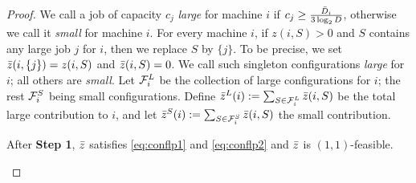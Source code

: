\begin{proof}
		We call a job of capacity $c_j$ {\em large} for machine $i$ if $c_j \geq \frac{\bar{D}_i}{3\log_2 D}$, otherwise we call it \emph{small} for machine $i$. 
%	
%		
%
%				
%
For every machine $i$, if $z(i,S) > 0$ and $S$ contains any large job $j$ for $i$, then we replace $S$ by $\{j\}$. To be precise, we set $\bar z(i,\{j\}) = z(i,S)$ and $\bar z(i,S) = 0$.
We call such singleton configurations {\em large} for $i$; all others are {\em small}. %
Let ${\cal F}^L_i$ be the collection of large configurations for $i$; the rest ${\cal F}^S_i$ being small configurations.
Define $\bar z^L(i) := \sum_{S\in {\cal F}^L_i} \bar z(i,S)$ be the total large contribution to $i$, and let $\bar z^S(i) := \sum_{S\in {\cal F}^S_i} \bar z(i,S)$ the small contribution.

\begin{claim}\label{clm:step1}
	After {\bf Step 1}, $\bar z$ satisfies \eqref{eq:conflp1} and \eqref{eq:conflp2} and $\bar z$ is $(1,1)$-feasible.
\end{claim}

 	
	
%	


\end{proof}

